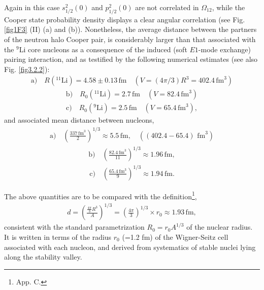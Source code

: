  Again in this case $s_{1/2}^2(0)$ and $p_{1/2}^2(0)$ are not correlated in $\Omega_{12}$, while the Cooper state probability density displays a clear angular correlation 
  (see Fig. \ref{fig1F3} (II) (a) and (b)). Nonetheless, the average distance between the partners of the neutron halo Cooper pair, is considerably larger than that associated with the $^9$Li core nucleons as a consequence of the induced (soft $E1$-mode exchange) pairing interaction, and as testified by the following numerical estimates (see also Fig. \ref{fig3.2.2}):
\begin{align}\label{eq3.2.21}
 \text{a)}\quad R(^{11}\text{Li})= 4.58\pm 0.13 \,\text{fm}\quad (V=\left(4\pi/3\right)R^3=402.4 \,\text{fm}^3)
\end{align}
\begin{align}
 \text{b)}\quad R_0 (^{11}\text{Li})=2.7\,\text{fm}\quad (V=82.4\,\text{fm}^3)
\end{align}
\begin{align}
 \text{c)}\quad R_0 (^{9}\text{Li})=2.5\,\text{fm}\quad (V=65.4\,\text{fm}^3),
\end{align}
and associated mean distance between nucleons, 
\begin{align}\label{eq3.2.24}
 \text{a)}\quad \left(\frac{337\,\text{fm}^3}{2}\right)^{1/3}\approx 5.5\,\text{fm},\quad((402.4-65.4)\text{ fm}^3)
\end{align}
\begin{align}
 \text{b)}\quad \left(\frac{82.4\,\text{fm}^3}{11}\right)^{1/3}\approx 1.96\,\text{fm},
\end{align}
\begin{align}\label{eq4.3.9}
 \text{c)}\quad \left(\frac{65.4\,\text{fm}^3}{9}\right)^{1/3}\approx 1.94\,\text{fm}.
\end{align}



The above quantities are to be compared with the definition\footnote{\cite{Brink:05} App. C.},
\begin{align}\label{eq3.2.27}
d=\left(\frac{\frac{4\pi}{3}R^3}{A}\right)^{1/3}=\left(\frac{4\pi}{3}\right)^{1/3}\times r_0\approx 1.93\, \text{fm},
\end{align} 
consistent with the standard parametrization $R_0=r_0A^{1/3}$ of the nuclear radius. It is written in terms of the  radius $r_0$ (=1.2 fm) of the Wigner-Seitz cell associated with each nucleon, and derived from systematics of stable nuclei lying along the stability valley.
